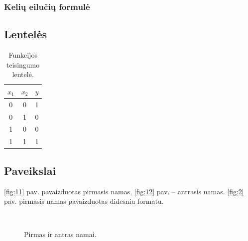 \documentclass[a4paper,12pt]{article}
\begin{document}
\subsubsection{Kelių eilučių formulė} \label{keliu}
      
 

 
\subsection{Lentelės} \label{lenteles}

\begin{table}[!htbp]
\caption{Funkcijos teisingumo lentelė.}
	\centering
	\begin{tabular}{|cc|c|}
		\hline
		$x_1$ & $x_2$ & $y$ \\
		\hline
		0 & 0 & 1 \\
		0 & 1 & 0 \\
		1 & 0 & 0 \\
		1 & 1 & 1 \\
		\hline
	\end{tabular}
\end{table}


\subsection{Paveikslai} \label{paveikslai}

\ref{fig:11} pav. pavaizduotas pirmasis namas, \ref{fig:12} pav. -- antrasis namas. \ref{fig:2} pav. pirmasis namas pavaizduotas didesniu formatu. 

\begin{figure}[!htbp] 
\centering
{}\ %
\caption{Pirmas ir antras namai.}
\label{fig:1} 
\end{figure} 
\end{document}
